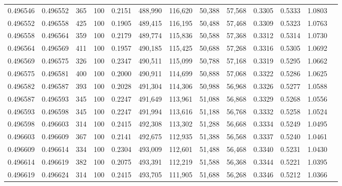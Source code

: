 \begin{tabular}{rrrrrrrrrrrrr}
0.496546 & 0.496552 &   365 & 100 &                                     0.2151 & 488,990 & 116,620 &  50,388 &  57,568 & 0.3305 & 0.5333 & 1.0803 \\
0.496552 & 0.496558 &   425 & 100 &                                     0.1905 & 489,415 & 116,195 &  50,488 &  57,468 & 0.3309 & 0.5323 & 1.0763 \\
0.496558 & 0.496564 &   359 & 100 &                                     0.2179 & 489,774 & 115,836 &  50,588 &  57,368 & 0.3312 & 0.5314 & 1.0730 \\
0.496564 & 0.496569 &   411 & 100 &                                     0.1957 & 490,185 & 115,425 &  50,688 &  57,268 & 0.3316 & 0.5305 & 1.0692 \\
0.496569 & 0.496575 &   326 & 100 &                                     0.2347 & 490,511 & 115,099 &  50,788 &  57,168 & 0.3319 & 0.5295 & 1.0662 \\
0.496575 & 0.496581 &   400 & 100 &                                     0.2000 & 490,911 & 114,699 &  50,888 &  57,068 & 0.3322 & 0.5286 & 1.0625 \\
0.496582 & 0.496587 &   393 & 100 &                                     0.2028 & 491,304 & 114,306 &  50,988 &  56,968 & 0.3326 & 0.5277 & 1.0588 \\
0.496587 & 0.496593 &   345 & 100 &                                     0.2247 & 491,649 & 113,961 &  51,088 &  56,868 & 0.3329 & 0.5268 & 1.0556 \\
0.496593 & 0.496598 &   345 & 100 &                                     0.2247 & 491,994 & 113,616 &  51,188 &  56,768 & 0.3332 & 0.5258 & 1.0524 \\
0.496598 & 0.496603 &   314 & 100 &                                     0.2415 & 492,308 & 113,302 &  51,288 &  56,668 & 0.3334 & 0.5249 & 1.0495 \\
0.496603 & 0.496609 &   367 & 100 &                                     0.2141 & 492,675 & 112,935 &  51,388 &  56,568 & 0.3337 & 0.5240 & 1.0461 \\
0.496609 & 0.496614 &   334 & 100 &                                     0.2304 & 493,009 & 112,601 &  51,488 &  56,468 & 0.3340 & 0.5231 & 1.0430 \\
0.496614 & 0.496619 &   382 & 100 &                                     0.2075 & 493,391 & 112,219 &  51,588 &  56,368 & 0.3344 & 0.5221 & 1.0395 \\
0.496619 & 0.496624 &   314 & 100 &                                     0.2415 & 493,705 & 111,905 &  51,688 &  56,268 & 0.3346 & 0.5212 & 1.0366 \\

\end{tabular}
